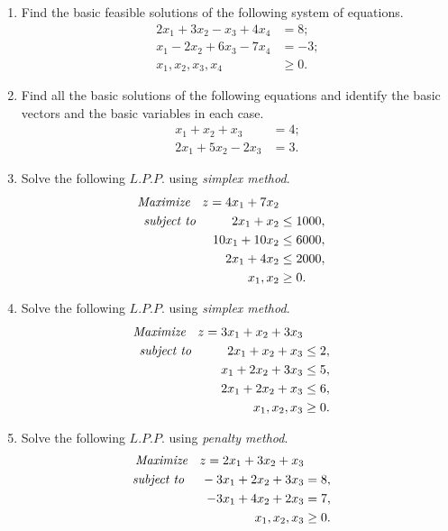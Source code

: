\documentclass[11pt, a4paper]{article}
\begin{document}
\begin{enumerate}
	

\item Find the basic feasible solutions of the following system of equations.
	\begin{align*}
2x_1 + 3x_2 - x_3 + 4x_4 &= 8; \\
x_1 - 2x_2 + 6x_3 - 7x_4 &= -3; \\
x_1, x_2, x_3, x_4 &\geq 0.	
	\end{align*}
	
	
	
\item Find all the basic solutions of the following equations and identify the basic vectors and the basic variables in each case.
	\begin{align*}
x_1 + x_2 + x_3 &= 4; \\
2x_1 + 5x_2 - 2x_3 &= 3.	
	\end{align*}
	


\item Solve the following $L.P.P.$ using \textit{simplex method}.
	\begin{align*}
\textit{Maximize \hspace{6pt}} z = 4x_1 + 7x_2 \\
\textit{subject to \hspace{25pt}} 2x_1 + x_2 &\leq 1000, \\
10x_1 + 10x_2 &\leq 6000, \\
2x_1 + 4x_2 &\leq 2000, \\
x_1, x_2 &\geq 0.
	\end{align*}
	
	
\item Solve the following $L.P.P.$ using \textit{simplex method}.
	\begin{align*}
\textit{Maximize \hspace{6pt}} z = 3x_1 + x_2 + 3x_3 \\
\textit{subject to \hspace{25pt}} 2x_1 + x_2 + x_3 &\leq 2, \\
x_1 + 2x_2 + 3x_3 &\leq 5, \\
2x_1 + 2x_2 + x_3 &\leq 6, \\
x_1, x_2, x_3 &\geq 0.
	\end{align*}
	


\item Solve the following $L.P.P.$ using \textit{penalty method}.
	\begin{align*}
\textit{Maximize \hspace{6pt}} z = 2x_1 + 3x_2 + x_3 \\
\textit{subject to \hspace{10pt}} -3x_1 + 2x_2 + 3x_3 &= 8, \\
-3x_1 + 4x_2 + 2x_3 &= 7, \\
x_1, x_2, x_3 &\geq 0.
	\end{align*}
	


\end{enumerate}
\end{document}
